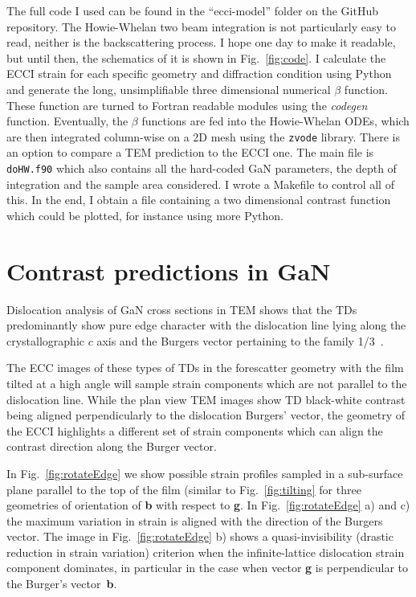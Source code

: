 The full code I used can be found in  the ``ecci-model'' folder on the GitHub repository. The Howie-Whelan two beam integration is not particularly easy  to read, neither is the backscattering process. I hope one day to make it readable, but until then, the schematics of it is shown in Fig.~\ref{fig:code}. I calculate the ECCI strain for each specific geometry and diffraction condition using Python and generate the long, unsimplifiable three dimensional numerical $\beta$ function. These function are turned to Fortran readable modules using the \textit{codegen} function. Eventually, the $\beta$ functions are fed into the Howie-Whelan ODEs, which are then integrated column-wise on a 2D mesh using the \texttt{zvode} library. There is an option to compare a TEM prediction to the ECCI one.   The main file is \texttt{doHW.f90} which also contains all the hard-coded GaN parameters, the depth of integration and the sample area considered. I wrote a Makefile to control all of this. In the end, I obtain a file containing a two dimensional contrast function which could be plotted, for instance using more Python. 



\section{Contrast predictions in GaN}
\label{sec:contrastGaN}
Dislocation analysis of GaN cross sections in TEM shows that the TDs predominantly show pure edge character with the dislocation line lying along the crystallographic $c$ axis and the Burgers vector pertaining to the family  1/3~\cite{Hino00}.

The ECC images of these types of TDs in the forescatter geometry with the film tilted at a high angle will sample strain components which are not parallel to the dislocation line. While the plan view TEM images show TD black-white contrast being aligned perpendicularly to the dislocation Burgers' vector, the geometry of the ECCI highlights a different set of strain components which can align the contrast direction along the Burger vector.

In Fig.~\ref{fig:rotateEdge} we show possible strain profiles sampled in a sub-surface plane parallel to the top of the film (similar to Fig.~\ref{fig:tilting} for three geometries of orientation of \textbf{b} with respect to \textbf{g}. In Fig.~\ref{fig:rotateEdge} a) and c) the maximum variation in strain is aligned with the direction of the Burgers vector. The image in Fig.~\ref{fig:rotateEdge} b) shows a quasi-invisibility (drastic reduction in strain variation) criterion when the infinite-lattice dislocation strain component dominates, in particular in the case when vector \textbf{g} is perpendicular to the Burger's vector~\textbf{b}.

